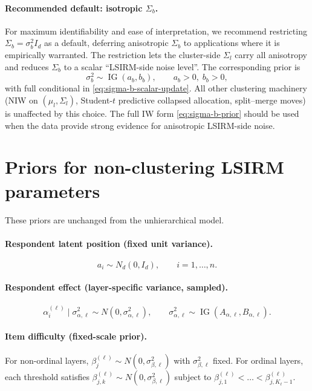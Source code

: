 \documentclass[11pt]{article}
\DeclareMathOperator{\IG}{IG}
\begin{document}
\paragraph{Recommended default: isotropic $\Sigma_b$.}
For maximum identifiability and ease of interpretation, we recommend
restricting $\Sigma_b=\sigma_b^2 I_d$ as a default, deferring anisotropic
$\Sigma_b$ to applications where it is empirically warranted.  The
restriction lets the cluster-side $\Sigma_l$ carry all anisotropy and
reduces $\Sigma_b$ to a scalar ``LSIRM-side noise level''.  The
corresponding prior is
\begin{equation}
    \sigma_b^2\sim\IG(a_b,b_b),
    \qquad a_b>0,\;b_b>0,
    \label{eq:sigma-b-scalar-prior}
\end{equation}
with full conditional in \eqref{eq:sigma-b-scalar-update}.  All other
clustering machinery (NIW on $(\mu_l,\Sigma_l)$, Student-$t$ predictive
collapsed allocation, split--merge moves) is unaffected by this choice.
The full IW form \eqref{eq:sigma-b-prior} should be used when the data
provide strong evidence for anisotropic LSIRM-side noise.

\section{Priors for non-clustering LSIRM parameters}

These priors are unchanged from the unhierarchical model.

\paragraph{Respondent latent position (fixed unit variance).}
\begin{equation}
    a_i \sim N_d(0,I_d),\qquad i=1,\dots,n.
    \label{eq:a-prior}
\end{equation}

\paragraph{Respondent effect (layer-specific variance, sampled).}
\begin{equation}
    \alpha_i^{(\ell)}\mid \sigma_{\alpha,\ell}^2
    \sim N(0,\sigma_{\alpha,\ell}^2),
    \qquad
    \sigma_{\alpha,\ell}^2 \sim \IG(A_{\alpha,\ell},B_{\alpha,\ell}).
    \label{eq:alpha-prior}
\end{equation}

\paragraph{Item difficulty (fixed-scale prior).}
For non-ordinal layers,
$\beta_j^{(\ell)}\sim N(0,\sigma_{\beta,\ell}^2)$ with $\sigma_{\beta,\ell}^2$
fixed.  For ordinal layers, each threshold satisfies
$\beta_{j,k}^{(\ell)}\sim N(0,\sigma_{\beta,\ell}^2)$ subject to
$\beta_{j,1}^{(\ell)}<\dots<\beta_{j,K_\ell-1}^{(\ell)}$.
\end{document}
